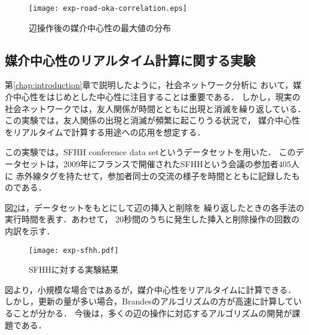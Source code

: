 \begin{figure}[tb]
  \centering
  \texttt{[image: exp-road-oka-correlation.eps]}
  \caption{辺操作後の媒介中心性の最大値の分布}
  \label{fig:exp-road-oka-correlation}
\end{figure}

\subsection{媒介中心性のリアルタイム計算に関する実験}
\label{subsect:exp-sfhh}

第\ref{chap:introduction}章で説明したように，社会ネットワーク分析に
おいて，媒介中心性をはじめとした中心性に注目することは重要である．
しかし，現実の社会ネットワークでは，友人関係が時間とともに出現と消滅を繰り返している．
この実験では，友人関係の出現と消滅が頻繁に起こりうる状況で，
媒介中心性をリアルタイムで計算する用途への応用を想定する．

この実験では，SFHH conference data set\cite{Genois2018}というデータセットを用いた．
このデータセットは，2009年にフランスで開催されたSFHHという会議の参加者$405$人に
赤外線タグを持たせて，参加者同士の交流の様子を時間とともに記録したものである．

図\ref{fig:exp-sfhh}は，データセットをもとにして辺の挿入と削除を
繰り返したときの各手法の実行時間を表す．あわせて，
20秒間のうちに発生した挿入と削除操作の回数の内訳を示す．

\begin{figure}[tb]
  \centering
  \texttt{[image: exp-sfhh.pdf]}
  \caption{SFHHに対する実験結果}
  \label{fig:exp-sfhh}
\end{figure}

図より，小規模な場合ではあるが，媒介中心性をリアルタイムに計算できる．
しかし，更新の量が多い場合，Brandesのアルゴリズムの方が高速に計算していることが分かる．
今後は，多くの辺の操作に対応するアルゴリズムの開発が課題である．
